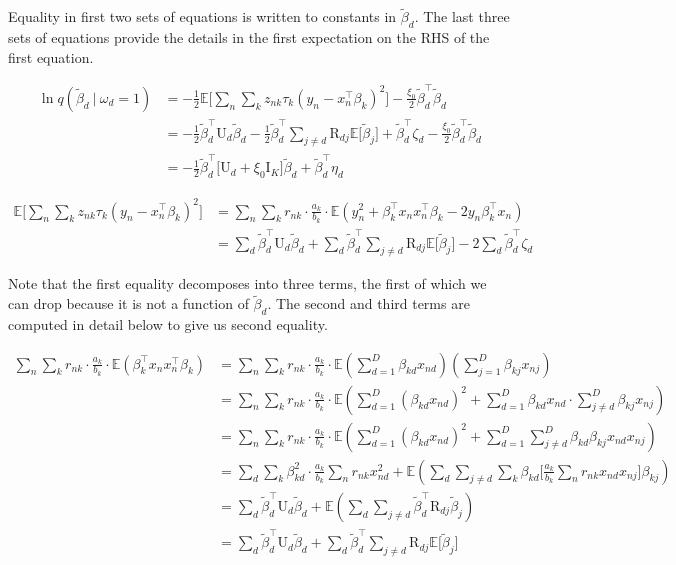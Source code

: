\documentclass[twoside,11pt]{article}
\newcommand\given[1][]{\:#1\vert\:}
\newcommand{\transpose}[1]{#1^{\intercal}}
\newcommand{\nsum}{\sum\limits_{n}}
\newcommand{\ksum}{\sum\limits_{k}}
\newcommand{\E}{\mathbb{E}}
\newcommand{\betad}{\tilde{\beta}_d}
\newcommand{\umat}{\mathrm{U}}
\begin{document}
Equality in first two sets of equations is written to constants in $\betad$. The last three sets of equations provide the details in the first expectation on the RHS of the first equation. 

\begin{align*}
	 \ln q\left(\betad \given \omega_d = 1 \right) &= - \frac{1}{2}\E \Big[ \nsum \ksum z_{nk} \tau_k \left( y_n - \transpose{x_n} \beta_k \right)^2\Big] - \frac{\xi_0}{2} \transpose{\betad} \betad \\
	 &= - \frac{1}{2} \transpose{\betad} \mathrm{U}_d \betad - \frac{1}{2} \transpose{\betad} \sum_{j \neq d} \mathrm{R}_{dj} \E \big[ \tilde{\beta}_j \big] + \transpose{\betad} \zeta_d - \frac{\xi_0}{2}  \transpose{\betad} \betad \\
	 &= - \frac{1}{2} \transpose{\betad} \big[ \umat_d +  \xi_0 \mathrm{I}_K\big] \betad + \transpose{\betad} \eta_d 
\end{align*}


\begin{align*}
	\E \Big[ \nsum \ksum z_{nk} \tau_k \left( y_n - \transpose{x_n} \beta_k \right)^2 \Big]  &= \nsum \ksum r_{nk} \cdot \frac{a_k}{b_k} \cdot \E \left( y_n^2 + \transpose{\beta_k} x_n \transpose{x_n} \beta_k - 2y_n \transpose{\beta_k}x_n \right) \\
	&=  \sum_d \transpose{\betad} \mathrm{U}_d \betad + \sum_d \transpose{\betad} \sum_{j \neq d} \mathrm{R}_{dj} \E \big[ \tilde{\beta}_j \big] - 2 \sum_d \transpose{\betad} \zeta_d
\end{align*}

Note that the first equality decomposes into three terms, the first of which we can drop because it is not a function of $\betad$. The second and third terms are computed in detail below to give us second equality. 

\begin{align*}
	\nsum \ksum r_{nk} \cdot \frac{a_k}{b_k} \cdot \E \left( \transpose{\beta_k} x_n \transpose{x_n} \beta_k \right) &= \nsum \ksum r_{nk} \cdot \frac{a_k}{b_k} \cdot \E \left( \sum_{d=1}^D \beta_{kd} x_{nd} \right) \left( \sum_{j=1}^D \beta_{kj} x_{nj} \right) \\
	&= \nsum \ksum r_{nk} \cdot \frac{a_k}{b_k} \cdot \E\left( \sum_{d=1}^D (\beta_{kd}x_{nd})^2 + \sum_{d=1}^D \beta_{kd} x_{nd} \cdot \sum_{j\neq d}^D \beta_{kj}x_{nj}\right) \\
	&= \nsum \ksum r_{nk} \cdot \frac{a_k}{b_k} \cdot \E \left( \sum_{d=1}^D (\beta_{kd}x_{nd})^2 + \sum_{d=1}^D \sum_{j\neq d}^D \beta_{kd} \beta_{kj} x_{nd} x_{nj} \right) \\
	&= \sum_{d} \ksum \beta_{kd}^2 \cdot \frac{a_k}{b_k} \nsum r_{nk} x_{nd}^2 + \E \left( \sum_{d} \sum_{j\neq d} \ksum \beta_{kd} \Big[\frac{a_k}{b_k}\sum_n r_{nk} x_{nd} x_{nj} \Big] \beta_{kj} \right) \\
	&= \sum_d \transpose{\betad} \mathrm{U}_d \betad + \E \left( \sum_d \sum_{j\neq d} \transpose{\betad} \mathrm{R}_{dj} \tilde{\beta}_j \right) \\
	&= \sum_d \transpose{\betad} \mathrm{U}_d \betad + \sum_d \transpose{\betad} \sum_{j \neq d} \mathrm{R}_{dj} \E \big[ \tilde{\beta}_j \big]
\end{align*}
\end{document}
